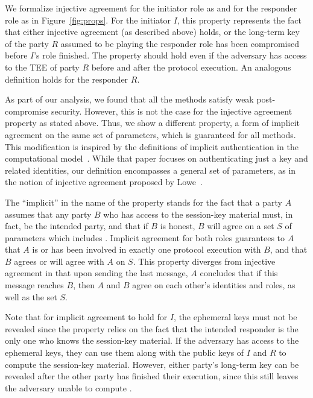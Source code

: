 \documentclass[runningheads]{llncs}
\begin{document}
%
We formalize injective agreement for the initiator role as \mPredInjI{} and
for the responder role as \mPredInjR{} in Figure~\ref{fig:props}.
%
For the initiator $I$, this property represents the fact that either
injective agreement (as described above) holds, or the long-term key of
the party $R$ assumed to be playing the responder role has been
compromised before $I$'s role finished.
%
The property should hold even if the adversary has access to the TEE of party 
$R$
before and after the protocol execution.
An analogous definition holds for the responder $R$.
%

As part of our analysis, we found that all the \mEdhoc{} methods satisfy weak
post-compromise security.
%
However, this is not the case for the injective agreement property as stated 
above.
%
Thus, we show a different property, a form of implicit agreement on the same
set of parameters, which is guaranteed for all methods.
%
This modification is inspired by the definitions of implicit authentication in
the computational model~\cite{DBLP:conf/csfw/GuilhemFW20}.
%
While that paper focuses on authenticating just a key and related identities,
our definition encompasses a general set of parameters, as in the notion of
injective agreement proposed by Lowe~\cite{DBLP:conf/csfw/Lowe97a}.

The ``implicit'' in the name of the property stands for the fact that a party
$A$ assumes that any party $B$ who has access to the session-key material
\mSessKey{} must, in fact, be the intended party, and that if $B$ is honest,
$B$ will agree on a set $S$ of parameters which includes \mSessKey.
%
Implicit agreement for both roles guarantees to $A$ that $A$ is or has been
involved in exactly one protocol execution with $B$, and that $B$ agrees or
will agree with $A$ on $S$.
%
This property diverges from injective agreement in that upon sending
the last message, $A$ concludes that if this message reaches $B$, then $A$
and $B$ agree on each other's identities and roles, as well as the set $S$.
%

Note that for implicit agreement to hold for $I$, the ephemeral keys must not
be revealed since the property relies on the fact that the intended responder
is the only one who knows the session-key material.
%
If the adversary has access to the ephemeral keys, they can use them along 
with
the public keys of $I$ and $R$ to compute the session-key material.
%
However, either party's long-term key can be revealed after the other
party has finished their execution, since this still leaves the adversary
unable to compute \mGxy{}.
%
\end{document}
